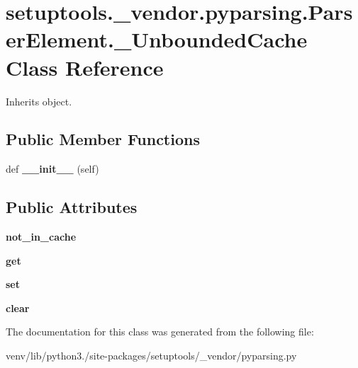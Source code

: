 \hypertarget{classsetuptools_1_1__vendor_1_1pyparsing_1_1_parser_element_1_1___unbounded_cache}{}\section{setuptools.\+\_\+vendor.\+pyparsing.\+Parser\+Element.\+\_\+\+Unbounded\+Cache Class Reference}
\label{classsetuptools_1_1__vendor_1_1pyparsing_1_1_parser_element_1_1___unbounded_cache}


Inherits object.

\subsection*{Public Member Functions}
\begin{DoxyCompactItemize}
\item 
\mbox{\label{classsetuptools_1_1__vendor_1_1pyparsing_1_1_parser_element_1_1___unbounded_cache_a3c25d2c88540d22cc403871ab7ea147f}} 
def {\bfseries \+\_\+\+\_\+init\+\_\+\+\_\+} (self)
\end{DoxyCompactItemize}
\subsection*{Public Attributes}
\begin{DoxyCompactItemize}
\item 
\mbox{\label{classsetuptools_1_1__vendor_1_1pyparsing_1_1_parser_element_1_1___unbounded_cache_a7a93c8a49b63eef19154d4477c666fd1}} 
{\bfseries not\+\_\+in\+\_\+cache}
\item 
\mbox{\label{classsetuptools_1_1__vendor_1_1pyparsing_1_1_parser_element_1_1___unbounded_cache_a324eb208529eff63ace99f997a97e978}} 
{\bfseries get}
\item 
\mbox{\label{classsetuptools_1_1__vendor_1_1pyparsing_1_1_parser_element_1_1___unbounded_cache_a496b36f48ec38f887e2285686354d4f5}} 
{\bfseries set}
\item 
\mbox{\label{classsetuptools_1_1__vendor_1_1pyparsing_1_1_parser_element_1_1___unbounded_cache_a89c1b2d6c3e9e3ff16261610bc1dd2d6}} 
{\bfseries clear}
\end{DoxyCompactItemize}


The documentation for this class was generated from the following file\+:\begin{DoxyCompactItemize}
\item 
venv/lib/python3./site-\/packages/setuptools/\+\_\+vendor/pyparsing.\+py\end{DoxyCompactItemize}
